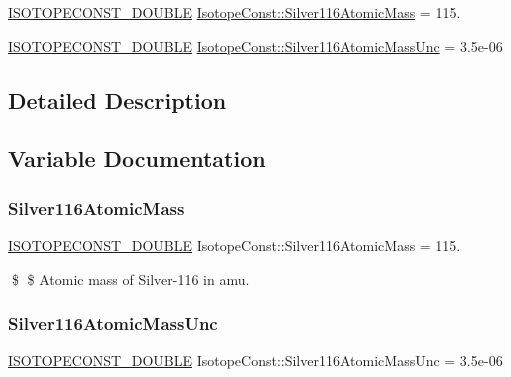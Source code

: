 \begin{DoxyCompactItemize}
\item 
\mbox{\hyperlink{group___isotope_const-_macros_ga8f45a7272ce02c0b4c65c44636ed719a}{I\+S\+O\+T\+O\+P\+E\+C\+O\+N\+S\+T\+\_\+\+D\+O\+U\+B\+LE}} \mbox{\hyperlink{group___isotope_const-_silver-_ag116_ga5334702114d79b3085e006ae1e63e8a5}{Isotope\+Const\+::\+Silver116\+Atomic\+Mass}} = 115.
\item 
\mbox{\hyperlink{group___isotope_const-_macros_ga8f45a7272ce02c0b4c65c44636ed719a}{I\+S\+O\+T\+O\+P\+E\+C\+O\+N\+S\+T\+\_\+\+D\+O\+U\+B\+LE}} \mbox{\hyperlink{group___isotope_const-_silver-_ag116_ga9ac9278200fb6f30fe09c1cb4cccda09}{Isotope\+Const\+::\+Silver116\+Atomic\+Mass\+Unc}} = 3.\+5e-\/06
\end{DoxyCompactItemize}


\subsection{Detailed Description}


\subsection{Variable Documentation}
\mbox{\label{group___isotope_const-_silver-_ag116_ga5334702114d79b3085e006ae1e63e8a5}} 
\subsubsection{\texorpdfstring{Silver116\+Atomic\+Mass}{Silver116AtomicMass}}
{\footnotesize\ttfamily \mbox{\hyperlink{group___isotope_const-_macros_ga8f45a7272ce02c0b4c65c44636ed719a}{I\+S\+O\+T\+O\+P\+E\+C\+O\+N\+S\+T\+\_\+\+D\+O\+U\+B\+LE}} Isotope\+Const\+::\+Silver116\+Atomic\+Mass = 115.}

\$ \$ Atomic mass of Silver-\/116 in amu. \mbox{\label{group___isotope_const-_silver-_ag116_ga9ac9278200fb6f30fe09c1cb4cccda09}} 
\subsubsection{\texorpdfstring{Silver116\+Atomic\+Mass\+Unc}{Silver116AtomicMassUnc}}
{\footnotesize\ttfamily \mbox{\hyperlink{group___isotope_const-_macros_ga8f45a7272ce02c0b4c65c44636ed719a}{I\+S\+O\+T\+O\+P\+E\+C\+O\+N\+S\+T\+\_\+\+D\+O\+U\+B\+LE}} Isotope\+Const\+::\+Silver116\+Atomic\+Mass\+Unc = 3.\+5e-\/06}

